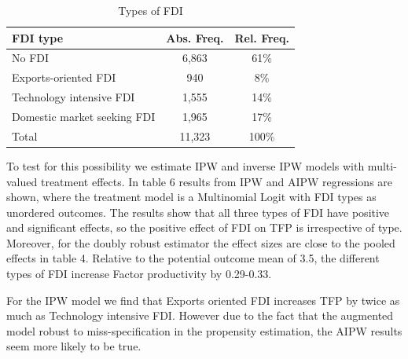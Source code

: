 \documentclass[a4paper,12pt]{scrartcl}
\begin{document}
\begin{table}

  \centering
   \caption{Types of FDI} 

\begin{tabular}{lcc} \hline
 FDI type&Abs. Freq.&Rel. Freq. \\
\hline
No FDI&6,863 & 61\% \\
Exports-oriented FDI&940 & 8\%\\
Technology intensive FDI & 1,555 & 14\% \\
Domestic market seeking FDI & 1,965 & 17\% \\
Total & 11,323 & 100\% \\
\end{tabular}
\end{table}




To test for this possibility we estimate IPW and inverse IPW models with multi-valued treatment effects. In table 6 results from IPW and AIPW regressions are shown, where the treatment model is a Multinomial Logit with FDI types as unordered outcomes. The results show that all three types of FDI have positive and significant effects, so the positive effect of FDI on TFP is irrespective of type. Moreover, for the doubly robust estimator the effect sizes are close to the pooled effects in table 4. Relative to the potential outcome mean of 3.5, the different types of FDI increase Factor productivity by 0.29-0.33. 

For the IPW model we find that Exports oriented FDI increases TFP by twice as much as Technology intensive FDI. However due to the fact that the augmented model robust to miss-specification in the propensity estimation, the AIPW results seem more likely to be true. 
\end{document}
